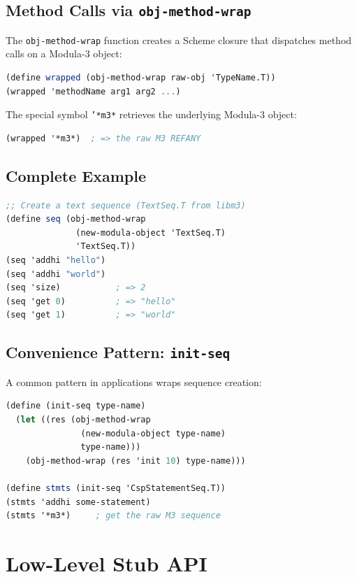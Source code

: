 \documentclass[12pt]{report}
\begin{document}
\subsection{Method Calls via {\tt obj-method-wrap}}

The {\tt obj-method-wrap} function creates a Scheme closure that
dispatches method calls on a Modula-3 object:

\begin{lstlisting}[language=Scheme]
(define wrapped (obj-method-wrap raw-obj 'TypeName.T))
(wrapped 'methodName arg1 arg2 ...)
\end{lstlisting}

The special symbol {\tt '*m3*} retrieves the underlying Modula-3 object:
\begin{lstlisting}[language=Scheme]
(wrapped '*m3*)  ; => the raw M3 REFANY
\end{lstlisting}

\subsection{Complete Example}

\begin{lstlisting}[language=Scheme]
;; Create a text sequence (TextSeq.T from libm3)
(define seq (obj-method-wrap
              (new-modula-object 'TextSeq.T)
              'TextSeq.T))
(seq 'addhi "hello")
(seq 'addhi "world")
(seq 'size)           ; => 2
(seq 'get 0)          ; => "hello"
(seq 'get 1)          ; => "world"
\end{lstlisting}

\subsection{Convenience Pattern: {\tt init-seq}}

A common pattern in applications wraps sequence creation:

\begin{lstlisting}[language=Scheme]
(define (init-seq type-name)
  (let ((res (obj-method-wrap
               (new-modula-object type-name)
               type-name)))
    (obj-method-wrap (res 'init 10) type-name)))

(define stmts (init-seq 'CspStatementSeq.T))
(stmts 'addhi some-statement)
(stmts '*m3*)     ; get the raw M3 sequence
\end{lstlisting}

\section{Low-Level Stub API}
\end{document}
